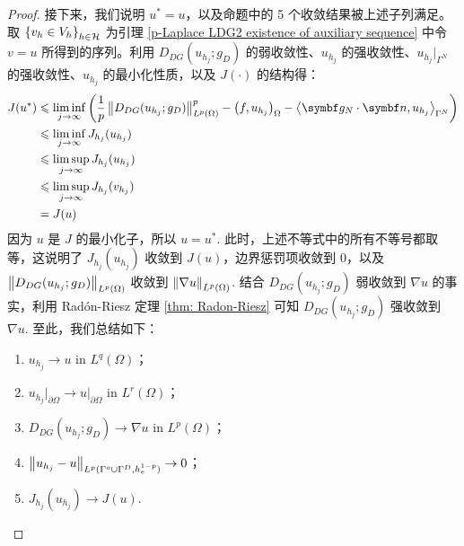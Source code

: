 \begin{theorem}
\begin{proof}
		接下来，我们说明 \(u^{\ast} = u\)，以及命题中的 5 个收敛结果被上述子列满足。取 \(\left\{v_{h} \in V_{h}\right\}_{h \in \mathcal{H}}\) 为引理 \ref{p-Laplace LDG2 existence of auxiliary sequence} 中令 \(v = u\) 所得到的序列。利用 \(D_{DG}(u_{h_{j}}; g_{D})\) 的弱收敛性、\(u_{h_{j}}\) 的强收敛性、\(u_{h_{j}}\big|_{\Gamma^{N}}\) 的强收敛性、\(u_{h_{j}}\) 的最小化性质，以及 \(J(\cdot)\) 的结构得：
		\begin{align*}
			J(u^{\ast}) 
			& \leqslant \liminf_{j \to \infty} \left( \frac{1}{p}\norm{D_{DG}(u_{h_{j}}; g_{D})}_{L^{p}(\Omega)}^{p} - \left(f, u_{h_{j}}\right)_{\Omega} - \left\langle \bm g_{N} \cdot \bm n, u_{h_{j}} \right\rangle_{\Gamma^{N}} \right) \\
			& \leqslant \liminf_{j \to \infty} J_{h_{j}}(u_{h_{j}}) \\
			& \leqslant \limsup_{j \to \infty} J_{h_{j}}(u_{h_{j}}) \\
			& \leqslant \limsup_{j \to \infty} J_{h_{j}}(v_{h_{j}}) \\
			& = J(u)
		\end{align*}
		因为 \(u\) 是 \(J\) 的最小化子，所以 \(u = u^{\ast}\). 此时，上述不等式中的所有不等号都取等，这说明了 \(J_{h_{j}}(u_{h_{j}})\) 收敛到 \(J(u)\)，边界惩罚项收敛到 \(0\)，以及 \(\left\lVert D_{DG}(u_{h_{j}}; g_{D})\right\rVert_{L^{p}(\Omega)}\) 收敛到 \(\left\lVert\nabla u\right\rVert_{L^{p}(\Omega)}\). 结合 \(D_{DG}(u_{h_{j}}; g_{D})\) 弱收敛到 \(\nabla u\) 的事实，利用 Rad\'{o}n-Riesz 定理 \ref{thm: Radon-Riesz} 可知 \(D_{DG}(u_{h_{j}}; g_{D})\) 强收敛到 \(\nabla u\). 至此，我们总结如下：
		\begin{enumerate}
			\item \(u_{h_{j}} \to u\) in \(L^{q}(\Omega)\)；
			\item \(u_{h_{j}}\big|_{\partial\Omega} \to u\big|_{\partial\Omega}\) in \(L^{r}(\Omega)\)；
			\item \(D_{DG}(u_{h_{j}}; g_{D}) \to \nabla u\) in \(L^{p}(\Omega)\)；
			\item \(\left\lVert u_{h_{j}} - u\right\rVert_{L^{p}(\Gamma^{o} \cup \Gamma^{D}, h_{e}^{1-p})} \to 0\)；
			\item \(J_{h_{j}}(u_{h_{j}}) \to J(u)\).
		\end{enumerate}


\end{proof}
\end{theorem}
